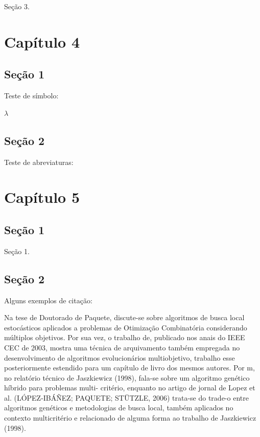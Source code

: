 \documentclass[
	12pt,			%
	openright,		%
	oneside,	
	a4paper,		%
	english,		%
	brazil			%
]{abntex2/abntex2}  %
\begin{document}
		Seção 3.
		
\chapter{Capítulo 4}

	\section{Seção 1}
	
		Teste de símbolo:
		
		$\lambda$
		
	\section{Seção 2}
	
		Teste de abreviaturas:
		
\chapter{Capítulo 5}

	\section{Seção 1}
	
		Seção 1.
	
	\section{Seção 2}
	
		Alguns exemplos de citação:

		Na tese de Doutorado de Paquete, discute-se sobre algoritmos de busca local estocásticos aplicados a problemas de Otimização Combinatória considerando múltiplos objetivos. Por sua vez, o trabalho de, publicado nos anais do IEEE CEC de 2003, mostra uma técnica de arquivamento também empregada no desenvolvimento de algoritmos evolucionários multiobjetivo, trabalho esse posteriormente estendido para um capítulo de livro dos mesmos autores. Por m, no relatório técnico de Jaszkiewicz (1998), fala-se sobre um algoritmo genético híbrido para problemas multi- critério, enquanto no artigo de jornal de Lopez et al. (LÓPEZ-IBÁÑEZ; PAQUETE; STÜTZLE, 2006) trata-se do trade-o entre algoritmos genéticos e metodologias de busca local, também aplicados no contexto multicritério e relacionado de alguma forma ao trabalho de Jaszkiewicz (1998).
\end{document}
